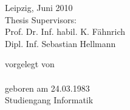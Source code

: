 \documentclass[a4paper,12pt]{report}
\begin{document}
\begin{titlepage}
\noindent\begin{minipage}[t]{.49\linewidth}
Leipzig, Juni 2010\\[2ex]
Thesis Supervisors:\\
Prof. Dr. Inf. habil. K. F\"ahnrich\\
Dipl. Inf. Sebastian Hellmann\\
\end{minipage}\hfill
\begin{minipage}[t]{5cm}
vorgelegt von\\[2ex]
\AUTHOR\\
geboren am 24.03.1983\\[2ex]
Studiengang Informatik
\end{minipage}\par

\end{titlepage} 
\end{document}
